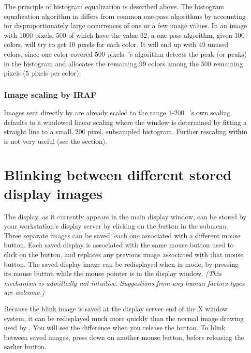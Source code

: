 The principle of histogram equalization is described above.  The
histogram equalization algorithm in {\SAO} differs from common
one-pass algorithms by accounting for disproportionately large
occurrences of one or a few image values.  In an image with 1000 
pixels, 500 of which have the value 32, a one-pass algorithm, given
100 colors, will try to get 10 pixels for each color.  It will end up
with 49 unused colors, since one color covered 500 pixels.  {\SAO}'s
algorithm detects the peak (or peaks) in the histogram
and allocates the remaining 99 colors among the 500 remaining pixels
(5 pixels per color). 

\subsubsection{ Image scaling by IRAF }

Images sent directly by {\IRAF} are already scaled to the range
1-200.  {\IRAF}\,'s own scaling defaults to a windowed linear scaling
where the window is determined by fitting a straight line to a small,
200 pixel, subsampled histogram.  Further rescaling within {\SAO}
is not very useful (see the {\IRAF} section).


\section{ Blinking between different stored display images } \label{blink-sec}

The display, as it currently appears in the main display window,
can be stored by your workstation's display server by clicking on
the  button in the  submenu.  Three separate
images can be saved, each one associated with a different mouse button.
Each saved display is associated with the same mouse button used to
click on the  button, and replaces any previous image
associated with that mouse button.  The saved display image can
be redisplayed when in  mode, by pressing its mouse button
while the mouse pointer is in the display window.  {\em (This mechanism is
admittedly not intuitive.  Suggestions from any human-factors types are
welcome.)}

Because the blink image is saved at the display server end of the
X window system, it can be redisplayed much more quickly than the
normal image drawing used by {\SAO}.  You will see the difference
when you release the  button.  To blink between saved
images, press down on another mouse button, before releasing the
earlier button.

